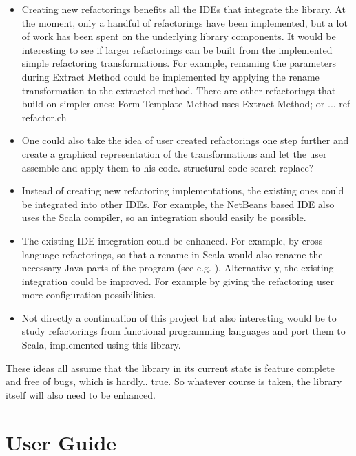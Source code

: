 \documentclass[10pt,a4paper,oneside]{scrreprt}
\begin{document}
\begin{itemize}
  \item Creating new refactorings benefits all the IDEs that integrate the library. At the moment, only a handful of refactorings have been implemented, but a lot of work has been spent on the underlying library components. It would be interesting to see if larger refactorings can be built from the implemented simple refactoring transformations. For example, renaming the parameters during Extract Method could be implemented by applying the rename transformation to the extracted method. There are other refactorings that build on simpler ones: Form Template Method uses Extract Method; or ... ref refactor.ch

  \item One could also take the idea of user created refactorings one step further and create a graphical representation of the transformations and let the user assemble and apply them to his code. structural code search-replace?

  \item Instead of creating new refactoring implementations, the existing ones could be integrated into other IDEs. For example, the NetBeans based IDE \cite{NetBeansJScalaIDE} also uses the Scala compiler, so an integration should easily be possible.

  \item The existing IDE integration could be enhanced. For example, by cross language refactorings, so that a rename in Scala would also rename the necessary Java parts of the program (see e.g. \cite{EclipseCrossLanguageRefactoring}). Alternatively, the existing integration could be improved. For example by giving the refactoring user more configuration possibilities.

  \item Not directly a continuation of this project but also interesting would be to study refactorings from functional programming languages and port them to Scala, implemented using this library. 
\end{itemize}

These ideas all assume that the library in its current state is feature complete and free of bugs, which is hardly.. true. So whatever course is taken, the library itself will also need to be enhanced. 

\appendix

\chapter{User Guide} \label{chapter:user-guide}
\end{document}
